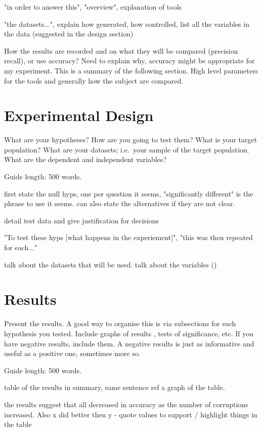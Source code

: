 \documentclass{csfourzero}
\begin{document}
"in order to answer this", "overview", explanation of tools

"the datasets...", explain how generated, how controlled, list all the variables in the data (suggested in the design section)

How the results are recorded and on what they will be compared (precision recall), or use accuracy? Need to explain why, accuracy might be appropriate for my experiment. This is a summary of the following section. High level parameters for the tools and generally how the subject are compared.

\section{Experimental Design}
\label{sec:exp}

What are your hypotheses? How are you going to test them? What is your
target population? What are your datasets; i.e.\ your sample of the
target population. What are the dependent and independent variables?

Guide length: 500 words.

first state the null hyps, one per question it seems, "significantly different" is the phrase to use it seems. can also state the alternatives if they are not clear.

detail test data and give justification for decisions

"To test these hyps [what happens in the experiement]", "this was then repeated for each..."

talk about the datasets that will be used. talk about the variables ()

\section{Results}
\label{sec:results}

Present the results. A good way to organise this is via subsections
for each hypothesis you tested. Include graphs of results
, tests of significance, etc. If you have
negative results, include them. A negative results is just as
informative and useful as a positive one, sometimes more so.

Guide length: 500 words.

table of the results in summary, same sentence ref a graph of the table.

the results suggest that all decreased in accuracy as the number of corruptions increased. Also x did better then y - quote values to support / highlight things in the table
\end{document}
